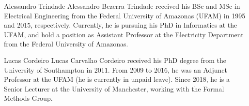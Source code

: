 \documentclass[journal]{IEEEtran}
\begin{document}


{}
%


% 

\begin{IEEEbiographynophoto}{Alessandro Trindade}
Alessandro Bezerra Trindade received his BSc and MSc in Electrical Engineering from the Federal University of Amazonas (UFAM) in 1995 and 2015, respectively. Currently, he is pursuing his PhD in Informatics at the UFAM, and hold a position as Assistant Professor at the Electricity Department from the Federal University of Amazonas.
\end{IEEEbiographynophoto}

\begin{IEEEbiographynophoto}{Lucas Cordeiro}
Lucas Carvalho Cordeiro received his PhD degree from the University of Southampton in 2011. From 2009 to 2016, he was an Adjunct Professor at the UFAM (he is currently in unpaid leave). Since 2018, he is a Senior Lecturer at the University of Manchester, working with the Formal Methods Group.
\end{IEEEbiographynophoto}
\end{document}
